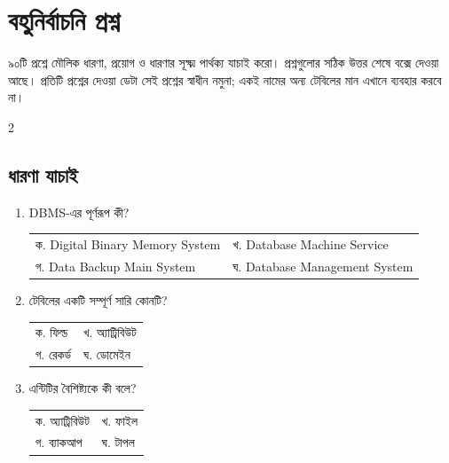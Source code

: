 \section{বহুনির্বাচনি প্রশ্ন}

৯০টি প্রশ্নে মৌলিক ধারণা, প্রয়োগ ও ধারণার সূক্ষ্ম পার্থক্য যাচাই করো। প্রশ্নগুলোর সঠিক উত্তর শেষে বক্সে দেওয়া আছে। প্রতিটি প্রশ্নের দেওয়া ডেটা সেই প্রশ্নের স্বাধীন নমুনা; একই নামের অন্য টেবিলের মান এখানে ব্যবহার করবে না।

\begin{multicols}{2}
\small
\subsection{ধারণা যাচাই}
\begin{enumerate}

\item \begin{minipage}[t]{\linewidth}
DBMS-এর পূর্ণরূপ কী?
\par
\begin{tabularx}{\linewidth}{@{}X X@{}}
ক. Digital Binary Memory System & খ. Database Machine Service \\
গ. Data Backup Main System & ঘ. Database Management System \\
\end{tabularx}
\end{minipage}
\vspace{1pt}

\item \begin{minipage}[t]{\linewidth}
টেবিলের একটি সম্পূর্ণ সারি কোনটি?
\par
\begin{tabularx}{\linewidth}{@{}X X@{}}
ক. ফিল্ড & খ. অ্যাট্রিবিউট \\
গ. রেকর্ড & ঘ. ডোমেইন \\
\end{tabularx}
\end{minipage}
\vspace{1pt}

\item \begin{minipage}[t]{\linewidth}
এন্টিটির বৈশিষ্ট্যকে কী বলে?
\par
\begin{tabularx}{\linewidth}{@{}X X@{}}
ক. অ্যাট্রিবিউট & খ. ফাইল \\
গ. ব্যাকআপ & ঘ. টাপল \\
\end{tabularx}
\end{minipage}
\vspace{1pt}


\end{enumerate}
\end{multicols}
